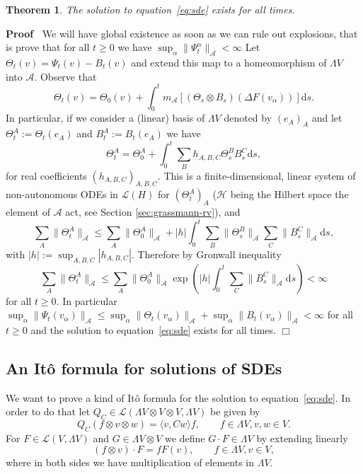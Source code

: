 \documentclass{article}
\newcommand{\assign}{:=}
\newcommand{\mathd}{\mathrm{d}}
\newenvironment{proof}{\noindent\textbf{Proof\ }}{\hspace*{\fill}$\Box$\medskip}
\newtheorem{theorem}{Theorem}
\begin{document}
\begin{theorem}
  \label{th:global-sol}The solution to equation~{\eqref{eq:sde}} exists for
  all times.
\end{theorem}

\begin{proof}
  We will have global existence as soon as we can rule out explosions, that is
  prove that for all $t \geqslant 0$ we have $\sup_{\alpha} \| \Psi_t^{\alpha}
  \|_{\mathcal{A}} < \infty$ Let $\Theta_t (v) = \Psi_t (v) - B_t (v)$ and
  extend this map to a homeomorphism of $\Lambda V$ into $\mathcal{A}$.
  Observe that
  \[ \Theta_t (v) = \Theta_0 (v) + \int_0^t m_{\mathcal{A}} [(\Theta_s \otimes
     B_s) (\Delta F (v_{\alpha}))] \mathd s. \]
  In particular, if we consider a (linear) basis of $\Lambda V$ denoted by
  $(e_A)_A$ and let $\Theta^A_t \assign \Theta_t (e_A)$ and $B^A_t \assign B_t
  (e_A)$ we have
  \[ \Theta_t^A = \Theta_0^A + \int_0^t \sum_B h_{A, B, C} \Theta_s^B B_s^C
     \mathd s, \]
  for real coefficients $(h_{A, B, C})_{A, B, C}$. This is a
  finite-dimensional, linear system of non-autonomous ODEs in $\mathcal{L}
  (H)$ for $(\Theta_t^A)_A$ ($\mathcal{H}$ being the Hilbert space the element
  of $\mathcal{A}$ act, see Section \ref{sec:grassmann-rv}), and
  \[ \sum_A \| \Theta_t^A \|_{\mathcal{A}} \leqslant \sum_A \| \Theta_0^A
     \|_{\mathcal{A}} + | h | \int_0^t \sum_B \| \Theta_s^B \|_{\mathcal{A}}
     \sum_C \| B_s^C \|_{\mathcal{A}} \mathd s, \]
  with $| h | \assign \sup_{A, B, C} | h_{A, B, C} |$. Therefore by Gronwall
  inequality
  \[ \sum_A \| \Theta_t^A \|_{\mathcal{A}} \leqslant \sum_A \| \Theta_0^A
     \|_{\mathcal{A}} \exp \left( | h | \int_0^t \sum_C \| B_s^C
     \|_{\mathcal{A}} \mathd s \right) < \infty \]
  for all $t \geqslant 0$. In particular $\sup_{\alpha} \| \Psi_t (v_{\alpha})
  \|_{\mathcal{A}} \leqslant \sup_{\alpha} \| \Theta_t (v_{\alpha})
  \|_{\mathcal{A}} + \sup_{\alpha} \| B_t (v_{\alpha}) \|_{\mathcal{A}} <
  \infty$ for all $t \geqslant 0$ and the solution to
  equation~{\eqref{eq:sde}} exists for all times.
\end{proof}

\subsection{An It{\^o} formula for solutions of SDEs}

We want to prove a kind of It{\^o} formula for the solution to
equation~{\eqref{eq:sde}}. In order to do that let $Q_C \in \mathcal{L}
(\Lambda V \otimes V \otimes V, \Lambda V)$ be given by
\begin{equation}
  Q_C (f \otimes v \otimes w) = \langle v, C w \rangle f, \qquad f \in \Lambda
  V, v, w \in V. \label{eq:QC}
\end{equation}
For $F \in \mathcal{L} (V, \Lambda V)$ and $G \in \Lambda V \otimes V$ we
define $G \cdot F \in \Lambda V$ by extending linearly
\[ (f \otimes v) \cdot F = f F (v), \qquad f \in \Lambda V, v \in V, \]
where in both sides we have multiplication of elements in $\Lambda V$.
\end{document}
